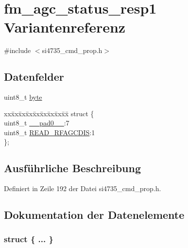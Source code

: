 \hypertarget{unionfm__agc__status__resp1}{}\section{fm\+\_\+agc\+\_\+status\+\_\+resp1 Variantenreferenz}
\label{unionfm__agc__status__resp1}


{\ttfamily \#include $<$si4735\+\_\+cmd\+\_\+prop.\+h$>$}

\subsection*{Datenfelder}
\begin{DoxyCompactItemize}
\item 
uint8\+\_\+t \hyperlink{unionfm__agc__status__resp1_a96f44d20f1dbf1c8785a7bc99a46164c}{byte}
\item 
\begin{tabbing}
xx\=xx\=xx\=xx\=xx\=xx\=xx\=xx\=xx\=\kill
struct \{\\
\>uint8\_t \hyperlink{unionfm__agc__status__resp1_a8b4eebe79ded0459acec2f4950102ba3}{\_\_pad0\_\_}:7\\
\>uint8\_t \hyperlink{unionfm__agc__status__resp1_a9cfeacf28a9e2117d6dab03603563164}{READ\_RFAGCDIS}:1\\
\}; \\

\end{tabbing}\end{DoxyCompactItemize}


\subsection{Ausführliche Beschreibung}


Definiert in Zeile 192 der Datei si4735\+\_\+cmd\+\_\+prop.\+h.



\subsection{Dokumentation der Datenelemente}
\hypertarget{unionfm__agc__status__resp1_a511c85eaa037ae89e91293c7af11e645}{}\subsubsection[{"@29}]{\setlength{\rightskip}{0pt plus 5cm}struct \{ ... \} }\label{unionfm__agc__status__resp1_a511c85eaa037ae89e91293c7af11e645}
\hypertarget{unionfm__agc__status__resp1_a8b4eebe79ded0459acec2f4950102ba3}{}
